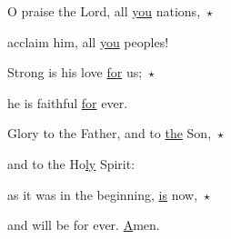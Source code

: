 \noindent O praise the Lord, all \uline{you} nations,~$\star$~\nopagebreak

acclaim him, all \uline{you} peoples!

\noindent Strong is his love \uline{for} us;~$\star$~\nopagebreak

he is faithful \uline{for} ever.

\noindent Glory to the Father, and to \uline{the} Son,~$\star$~\nopagebreak

and to the Ho\uline{ly} Spirit:

\noindent as it was in the beginning, \uline{is} now,~$\star$~\nopagebreak

and will be for ever. \uline{A}men.

